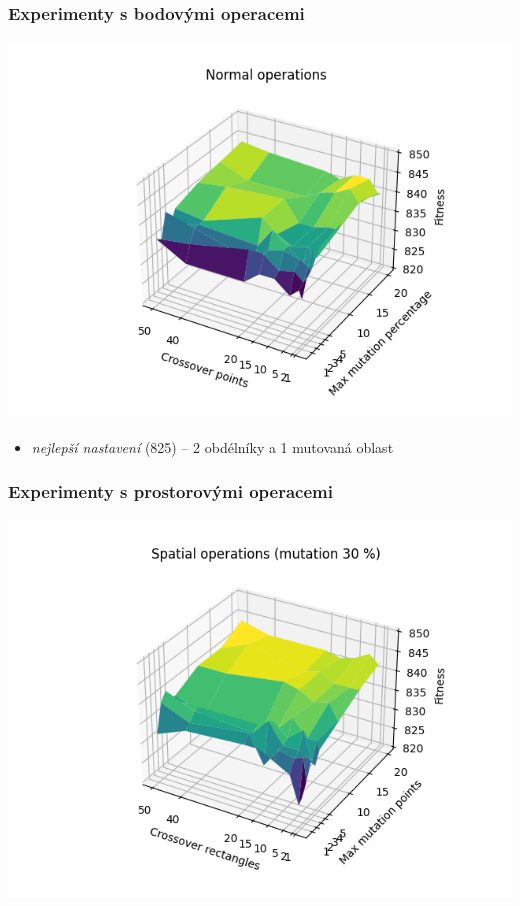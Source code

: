 \documentclass[10pt,xcolor=pdflatex,hyperref={unicode}]{beamer}
\begin{document}
\begin{frame}
\frametitle{Experimenty s bodovými operacemi}
\includegraphics[width=0.8\paperwidth]{img/normal.png}
\end{frame}

\begin{frame}
\begin{itemize}
    \item \emph{nejlepší nastavení} (825) -- 2 obdélníky a 1 mutovaná oblast
\end{itemize}
\frametitle{Experimenty s prostorovými operacemi}
\includegraphics[width=0.8\paperwidth]{img/spatial30.png}
\end{frame}
\end{document}
